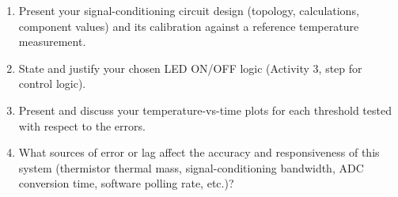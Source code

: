 \begin{reportq}
  \begin{enumerate}
    \item Present your signal-conditioning circuit design (topology, calculations, component values) and its calibration against a reference temperature measurement.
    \item State and justify your chosen LED ON/OFF logic (Activity 3, step for control logic).
    \item Present and discuss your temperature-vs-time plots for each threshold tested with respect to the errors.
    \item What sources of error or lag affect the accuracy and responsiveness of this system (thermistor thermal mass, signal-conditioning bandwidth, ADC conversion time, software polling rate, etc.)?
  \end{enumerate}
\end{reportq}
